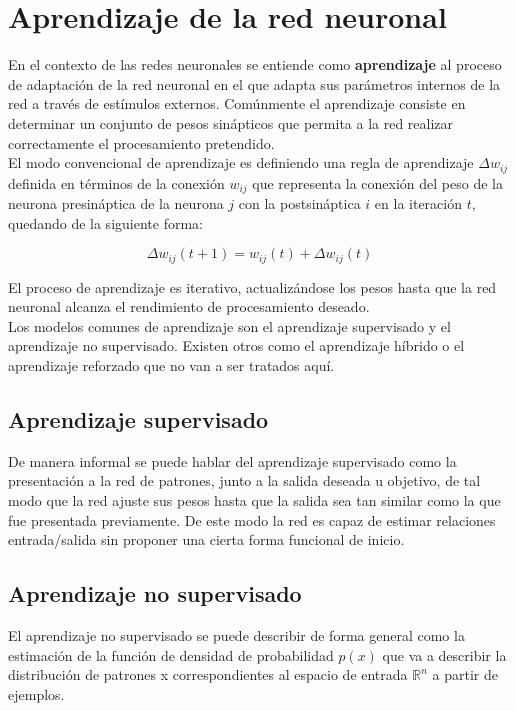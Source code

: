 \section{Aprendizaje de la red neuronal}

En el contexto de las redes neuronales se entiende como
\textbf{aprendizaje} al proceso de adaptación de la red neuronal en el
que adapta sus parámetros internos de la red a través de estímulos
externos. Comúnmente el aprendizaje consiste en determinar un conjunto
de pesos sinápticos que permita a la red realizar correctamente el
procesamiento pretendido.\\

El modo convencional de aprendizaje es definiendo una regla de
aprendizaje $\Delta w_{ij}$ definida en términos de la conexión
$w_{ij}$ que representa la conexión del peso de la neurona
presináptica de la neurona $j$ con la postsináptica $i$ en la
iteración $t$, quedando de la siguiente forma:

\begin{equation}
  \Delta w_{ij}(t+1) = w_{ij}(t) + \Delta w_{ij}(t)
\end{equation}

El proceso de aprendizaje es iterativo, actualizándose los pesos hasta
que la red neuronal alcanza el rendimiento de procesamiento deseado.\\

Los modelos comunes de aprendizaje son el aprendizaje supervisado y el
aprendizaje no supervisado. Existen otros como el aprendizaje híbrido
o el aprendizaje reforzado que no van a ser tratados aquí.

\subsection{Aprendizaje supervisado}

De manera informal se puede hablar del aprendizaje supervisado como la
presentación a la red de patrones, junto a la salida deseada u
objetivo, de tal modo que la red ajuste sus pesos hasta que la salida
sea tan similar como la que fue presentada previamente. De este modo
la red es capaz de estimar relaciones entrada/salida sin proponer una
cierta forma funcional de inicio.

\subsection{Aprendizaje no supervisado}

El aprendizaje no supervisado se puede describir de forma general como
la estimación de la función de densidad de probabilidad $p(x)$ que va
a describir la distribución de patrones x correspondientes al espacio
de entrada $\mathbb{R}^n$ a partir de ejemplos. \\

